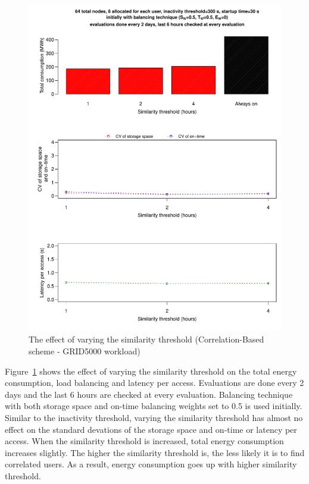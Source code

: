 \begin{figure}[!htbp]
\centering
\includegraphics[width=\columnwidth,keepaspectratio]{FIG13.pdf}
\caption{The effect of varying the similarity threshold (Correlation-Based scheme - GRID5000 workload)}
\label{eightthresult}
\end{figure} 

Figure~\ref{eightthresult} shows the effect of varying the similarity threshold on the total energy
consumption, load balancing and latency per access. Evaluations are done every 2 days and the last 6 hours
are checked at every evaluation. Balancing technique with both storage space and on-time balancing
weights set to 0.5 is used initially. Similar to the inactivity threshold, varying the
similarity threshold has almost no effect on the standard devations of the storage space and on-time
or latency per access. When the similarity threshold is increased, total energy consumption
increases slightly. The higher the similarity threshold is, the less likely it is to find correlated
users. As a result, energy consumption goes up with higher similarity threshold.

